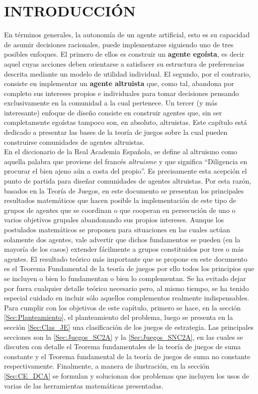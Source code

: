 \section{INTRODUCCIÓN}
En términos generales, la autonomía de un agente artificial, esto es su capacidad de asumir decisiones racionales, puede  implementarse siguiendo uno de tres posibles enfoques. El primero de ellos es construir un \textbf{agente egoísta}, es decir aquel cuyas acciones deben orientarse a satisfacer su estructura de preferencias descrita mediante un modelo de utilidad individual.  El segundo, por el contrario, consiste en implementar un \textbf{agente altruista} que, como tal, abandona por completo sus intereses propios e individuales para tomar decisiones pensando exclusivamente en la comunidad a la cual pertenece. Un tercer (y más interesante) enfoque de diseño consiste en construir agentes que, sin ser completamente egoístas tampoco son, en absoluto, altruistas.  Este capítulo está dedicado a presentar las bases de la teoría de juegos sobre la cual pueden construirse comunidades de agentes altruistas.\\

En el diccionario de la Real Academia Española, se define al altruismo como aquella palabra que proviene del francés \textit{altruisme} y que significa “Diligencia en procurar el bien ajeno aún a costa del propio”.  Es precisamente esta acepción el punto de partida para diseñar comunidades de agentes altruistas.  Por esta razón, basados en la Teoría de Juegos, en este documento se presentan los principales resultados matemáticos que hacen posible la implementación de este tipo de grupos de agentes que se coordinan o que cooperan en persecución de uno o varios objetivos grupales abandonando sus propios intereses.  Aunque los postulados matemáticos se proponen para situaciones en las cuales actúan solamente dos agentes, vale advertir que dichos fundamentos se pueden (en la mayoría de los casos) extender fácilmente a grupos constituidos por tres o más agentes.  El resultado teórico más importante que se propone en este documento es el Teorema Fundamental de la teoría de juegos por ello todos los principios que se incluyen o bien lo fundamentan o bien lo complementan.  Se ha evitado dejar por fuera cualquier detalle teórico necesario pero, al mismo tiempo, se ha tenido especial cuidado en incluir sólo aquellos complementos realmente indispensables.\\

Para cumplir con los objetivos de este capítulo, primero se hace, en la sección \ref{Sec:Planteamiento},  el planteamiento del problema, luego se presenta en la sección \ref{Sec:Clas_JE} una clasificación de los juegos de estrategia.  Las principales secciones son la \ref{Sec:Juegos_SC2A} y la \ref{Sec:Juegos_SNC2A}, en las cuales se discuten con detalle el Teorema fundamentales de la teoría de juegos de suma constante y el Teorema fundamental de la teoría de juegos de suma no constante respectivamente.  Finalmente, a manera de ilustración, en la sección \ref{Sec:CE_DCA} se formulan y solucionan dos problemas que incluyen los usos de varias de las herramientas matemáticas presentadas.\\

